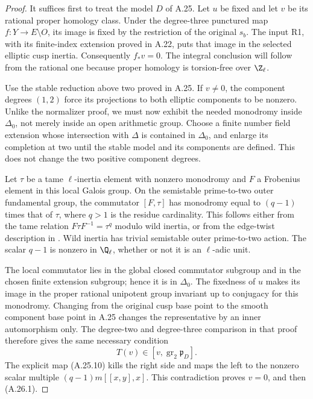 \begin{proof}
It suffices first to treat the model $D$ of A.25.
Let $u$ be fixed and let $v$ be its rational proper
homology class. Under the degree-three punctured
map $f:Y\to E\setminus O$, its image is fixed by
the restriction of the original $s_b$.
The input R1, with its finite-index extension
proved in A.22, puts that image in the selected
elliptic cusp inertia. Consequently $f_*v=0$.
The integral conclusion will follow from the
rational one because proper homology is
torsion-free over $\Z_\ell$.

Use the stable reduction above two proved in A.25.
If $v\ne0$, the component degrees $(1,2)$ force
its projections to both elliptic components to
be nonzero. Unlike the normalizer proof, we must
now exhibit the needed monodromy inside
$\Delta_0$, not merely inside an open arithmetic
group. Choose a finite number field extension
whose intersection with $\Delta$ is contained
in $\Delta_0$, and enlarge its completion at two
until the stable model and its components are
defined. This does not change the two positive
component degrees.

Let $\tau$ be a tame $\ell$-inertia element with
nonzero monodromy and $F$ a Frobenius element in
this local Galois group. On the semistable
prime-to-two outer fundamental group, the
commutator $[F,\tau]$ has monodromy equal to
$(q-1)$ times that of $\tau$, where $q>1$ is the
residue cardinality. This follows either from
the tame relation $F\tau F^{-1}=\tau^q$ modulo
wild inertia, or from the edge-twist description
in \cite[Definition 3.1.5 and Theorem 3.1.6]{fghBettsDogra}.
Wild inertia has trivial semistable outer
prime-to-two action. The scalar $q-1$ is nonzero
in $\Q_\ell$, whether or not it is an $\ell$-adic
unit.

The local commutator lies in the global closed
commutator subgroup and in the chosen finite
extension subgroup; hence it is in $\Delta_0$.
The fixedness of $u$ makes its image in the
proper rational unipotent group invariant up
to conjugacy for this monodromy. Changing from
the original cusp base point to the smooth
component base point in A.25 changes the
representative by an inner automorphism only.
The degree-two and degree-three comparison
in that proof therefore gives the same
necessary condition
\[
                 T(v)\in[v,\operatorname{gr}_2
                                      \mathfrak p_D].
\]
The explicit map (A.25.10) kills the right side
and maps the left to the nonzero scalar multiple
$(q-1)m[[x,y],x]$. This contradiction proves
$v=0$, and then (A.26.1).


\end{proof}
